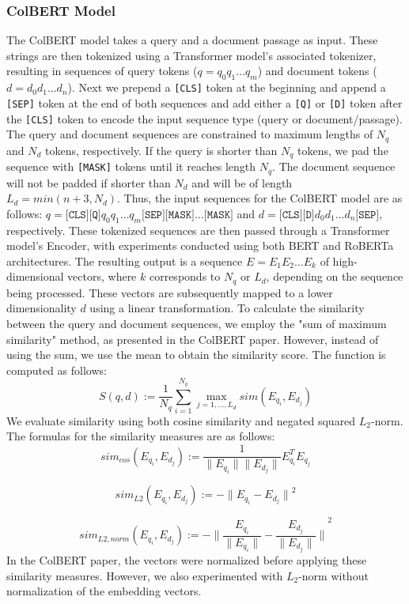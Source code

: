 \documentclass{article}
\begin{document}
\subsubsection{ColBERT Model}
The ColBERT model takes a query and a document passage as input. These strings are then tokenized using a Transformer model's associated tokenizer, resulting in sequences of query tokens ($q = q_0q_1\dots q_m$) and document tokens ($d = d_0d_1\dots d_n$). Next we prepend a \texttt{[CLS]} token at the beginning and append a \texttt{[SEP]} token at the end of both sequences and add either a \texttt{[Q]} or \texttt{[D]} token after the \texttt{[CLS]} token to encode the input sequence type (query or document/passage). The query and document sequences are constrained to maximum lengths of $N_q$ and $N_d$ tokens, respectively. If the query is shorter than $N_q$ tokens, we pad the sequence with \texttt{[MASK]} tokens until it reaches length $N_q$. The document sequence will not be padded if shorter than $N_d$ and will be of length $L_d = min(n + 3, N_d)$. Thus, the input sequences for the ColBERT model are as follows: $q = \texttt{[CLS]}\texttt{[Q]}q_0q_1 \dots q_m\texttt{[SEP]}\texttt{[MASK]}\dots\texttt{[MASK]}$ and $d = \texttt{[CLS]}\texttt{[D]}d_0d_1 \dots d_{n}\texttt{[SEP]}$, respectively. These tokenized sequences are then passed through a Transformer model's Encoder, with experiments conducted using both BERT \cite{devlin2019bert} and RoBERTa \cite{liu2019roberta} architectures. The resulting output is a sequence $E = E_1E_2 \dots E_k$ of high-dimensional vectors, where $k$ corresponds to $N_q$ or $L_d$, depending on the sequence being processed. These vectors are subsequently mapped to a lower dimensionality $d$ using a linear transformation. To calculate the similarity between the query and document sequences, we employ the "sum of maximum similarity" method, as presented in the ColBERT paper. However, instead of using the sum, we use the mean to obtain the similarity score. The function is computed as follows:
$$ S(q,d) := \frac{1}{N_q} \sum_{i=1}^{N_q} \max_{j = 1, \dots, L_d} sim(E_{q_i}, E_{d_j})
$$
We evaluate similarity using both cosine similarity and negated squared $L_2$-norm. The formulas for the similarity measures are as follows:
$$
sim_{cos}(E_{q_i}, E_{d_j}) := \frac{1}{\| E_{q_i} \|\| E_{d_j} \|} E_{q_i}^TE_{q_j} 
$$

$$
sim_{L2}(E_{q_i}, E_{d_j}) := -{\| E_{q_i} -E_{d_j} \|}^2
$$

$$
sim_{L2,norm}(E_{q_i}, E_{d_j}) := -{\| \frac{E_{q_i}}{\| E_{q_i} \|}  - \frac{E_{d_j}}{\| E_{d_j} \|} \|}^2
$$
In the ColBERT paper, the vectors were normalized before applying these similarity measures. However, we also experimented with $L_2$-norm without normalization of the embedding vectors.
\end{document}
